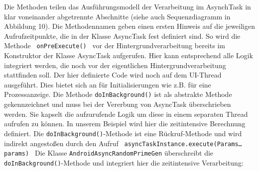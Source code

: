 \documentclass[12pt,oneside,a4paper,bibtotoc,liststotoc]{scrreprt}
\begin{document}
Die Methoden teilen das Ausführungsmodell der Verarbeitung im AsynchTask in klar voneinander abgetrennte Abschnitte (siehe auch Sequenzdiagramm in Abbildung 10). Die Methodennamen geben einen ersten Hinweis auf die jeweiligen Aufrufzeitpunkte, die in der Klasse AsyncTask fest definiert sind. So wird die Methode\newline 
\texttt{\newline
onPreExecute()\newline
}\newline
vor der Hintergrundverarbeitung bereits im Konstruktor der Klasse AsyncTask aufgerufen. Hier kann entsprechend alle Logik integriert werden, die noch vor der eigentlichen Hintergrundverarbeitung stattfinden soll. Der hier definierte Code wird noch auf dem UI-Thread ausgeführt. Dies bietet sich an für Initialisierungen wie z.B. für eine Prozessanzeige.\newline
Die Methode\newline \newline
\texttt{doInBackground()}\newline\newline
ist als abstrakte Methode gekennzeichnet und muss bei der Vererbung von AsyncTask überschrieben werden. Sie kapselt die aufzurufende Logik um diese in einem separaten Thread aufrufen zu können. In unserem Beispiel wird hier die zeitintensive Berechnung definiert. Die \texttt{doInBackground()}-Methode ist eine Rückruf-Methode und wird indirekt angestoßen durch den Aufruf\newline 
\texttt{\newline
asyncTaskInstance.execute(Params…params)\newline
}\newline
Die Klasse \texttt{AndroidAsyncRandomPrimeGen} überschreibt die \texttt{doInBackground()}-Methode und integriert hier die zeitintensive Verarbeitung:\newline
\end{document}
